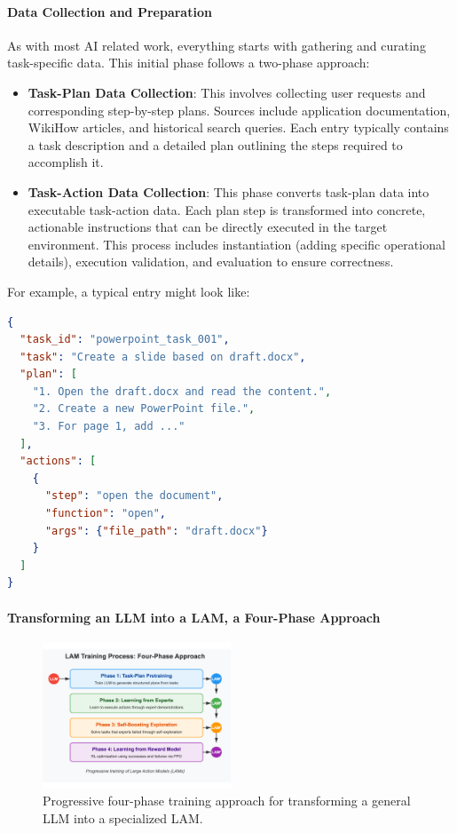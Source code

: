 \documentclass[journal,twoside,10pt]{IEEEtran}
\begin{document}
\paragraph{Data Collection and Preparation}
As with most AI related work, everything starts with gathering and curating task-specific data. This initial phase follows a two-phase approach:

\begin{itemize}
    \item \textbf{Task-Plan Data Collection}: This involves collecting user requests and corresponding step-by-step plans. Sources include application documentation, WikiHow articles, and historical search queries. Each entry typically contains a task description and a detailed plan outlining the steps required to accomplish it.
    
    \item \textbf{Task-Action Data Collection}: This phase converts task-plan data into executable task-action data. Each plan step is transformed into concrete, actionable instructions that can be directly executed in the target environment. This process includes instantiation (adding specific operational details), execution validation, and evaluation to ensure correctness.
\end{itemize}

For example, a typical entry might look like:

\begin{lstlisting}[language=JSON]
{
  "task_id": "powerpoint_task_001",
  "task": "Create a slide based on draft.docx",
  "plan": [
    "1. Open the draft.docx and read the content.",
    "2. Create a new PowerPoint file.",
    "3. For page 1, add ..."
  ],
  "actions": [
    {
      "step": "open the document",
      "function": "open",
      "args": {"file_path": "draft.docx"}
    }
  ]
}
\end{lstlisting}

\paragraph{Transforming an LLM into a LAM, a Four-Phase Approach}

\begin{figure}[htbp]
    \centering
    \includegraphics[width=0.5\textwidth]{traning_phases.pdf}
    \caption{Progressive four-phase training approach for transforming a general LLM into a specialized LAM.}
    \label{fig:lam-training}
\end{figure}
\end{document}
